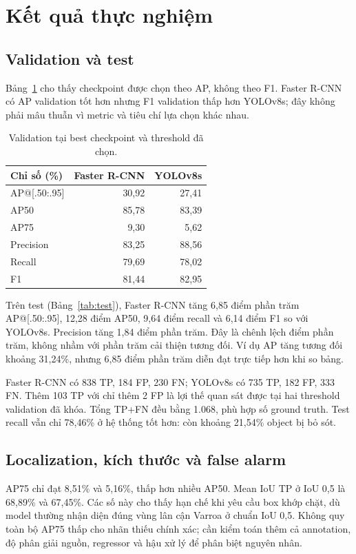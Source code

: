 \documentclass[a4paper,10pt,twocolumn]{article}
\newcommand{\FR}{Faster R-CNN}
\newcommand{\YO}{YOLOv8s}
\begin{document}
\section{Kết quả thực nghiệm}
\subsection{Validation và test}
Bảng~\ref{tab:val} cho thấy checkpoint được chọn theo AP, không theo F1.
\FR{} có AP validation tốt hơn nhưng F1 validation thấp hơn \YO{}; đây không phải
mâu thuẫn vì metric và tiêu chí lựa chọn khác nhau.

\begin{table}[t]
\centering\small
\caption{Validation tại best checkpoint và threshold đã chọn.}
\label{tab:val}
\begin{tabular}{lrr}
\toprule
Chỉ số (\%) & Faster R-CNN & YOLOv8s \\
\midrule
AP@[.50:.95] & 30,92 & 27,41 \\
AP50 & 85,78 & 83,39 \\
AP75 & 9,30 & 5,62 \\
Precision & 83,25 & 88,56 \\
Recall & 79,69 & 78,02 \\
F1 & 81,44 & 82,95 \\
\bottomrule
\end{tabular}
\end{table}

\begin{table}[t]
\centering\small
\caption{Test trên 3.408 ảnh, 1.068 ground-truth box. Bảng sinh từ metrics JSON.}
\label{tab:test}

\end{table}

Trên test (Bảng~\ref{tab:test}), \FR{} tăng 6,85 điểm phần trăm AP@[.50:.95],
12,28 điểm AP50, 9,64 điểm recall và 6,14 điểm F1 so với \YO{}.
Precision tăng 1,84 điểm phần trăm. Đây là chênh lệch điểm phần trăm, không nhầm
với phần trăm cải thiện tương đối. Ví dụ AP tăng tương đối khoảng 31,24\%, nhưng
6,85 điểm phần trăm diễn đạt trực tiếp hơn khi so bảng.

\FR{} có 838 TP, 184 FP, 230 FN; \YO{} có 735 TP, 182 FP, 333 FN.
Thêm 103 TP với chỉ thêm 2 FP là lợi thế quan sát được tại hai threshold validation
đã khóa. Tổng TP+FN đều bằng 1.068, phù hợp số ground truth. Test recall vẫn chỉ
78,46\% ở hệ thống tốt hơn: còn khoảng 21,54\% object bị bỏ sót.

\subsection{Localization, kích thước và false alarm}
AP75 chỉ đạt 8,51\% và 5,16\%, thấp hơn nhiều AP50. Mean IoU TP ở IoU 0,5 là
68,89\% và 67,45\%. Các số này cho thấy hạn chế khi yêu cầu box khớp chặt, dù model
thường nhận diện đúng vùng lân cận Varroa ở chuẩn IoU 0,5.
Không quy toàn bộ AP75 thấp cho nhãn thiếu chính xác; cần kiểm toán thêm cả annotation,
độ phân giải nguồn, regressor và hậu xử lý để phân biệt nguyên nhân.
\end{document}
